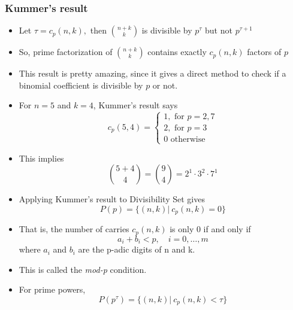 \documentclass{beamer}
\begin{document}
\begin{frame}
    \frametitle{Kummer's result}
    \begin{itemize}
        \item Let $\tau = c_p(n,k),$ then $\binom{n+k}{k}$ is divisible by $p^\tau$ but not $p^{\tau + 1}$
        \item So, prime factorization of $\binom{n+k}{k}$ contains exactly $c_p(n,k)$ factors of $p$
        \item This result is pretty amazing, since it gives a direct method to check if a binomial coefficient is divisible by $p$ or not.
        \item For $n=5$ and $k=4$, Kummer's result says
        \begin{equation*}
            c_{p}(5,4)=\left\{\begin{array}{l}{1, \text { for } p=2,7} \\
            {2, \text { for } p=3 } \\
        {0 \text{ otherwise }}\end{array}\right.
        \end{equation*}
        \item This implies 
        \begin{equation*}
            \binom{5+4}{4} = \binom{9}{4} = 2^1 \cdot 3^2 \cdot 7^1
        \end{equation*}
    \end{itemize}
\end{frame}

\begin{frame}
    \begin{itemize}
        \item Applying Kummer's result to Divisibility Set gives 
        \begin{equation*}
            P(p) = \{(n,k) | \ c_p(n,k) = 0\}
        \end{equation*}
        \item That is, the number of carries $c_p(n,k)$ is only $0$ if and only if 
        \begin{equation*}
            a_i + b_i < p, \quad i = 0,\dots,m
        \end{equation*}
        where $a_i$ and $b_i$ are the p-adic digits of n and k. 
        \item This is called the \textit{mod-p} condition.
        \item For prime powers, 
        \begin{equation*}
            P(p^\tau) = \{(n,k)| \ c_p(n,k) < \tau \}
        \end{equation*}
    \end{itemize}
\end{frame}
\end{document}
